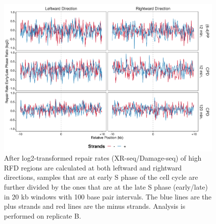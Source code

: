 \begin{figure}[H]
\begin{center}
\includegraphics[width=\textwidth]{Chapters/7_appendix/figures/supfig69}
\caption[Repair rate early/late ratio of high RFDs in 20 kb (replicate B).]{After log2-transformed repair rates (XR-seq/Damage-seq) of high RFD regions are calculated at both leftward and rightward directions, samples that are at early S phase of the cell cycle are further divided by the ones that are at the late S phase (early/late) in 20 kb windows with 100 base pair intervals. The blue lines are the plus strands and red lines are the minus strands. Analysis is performed on replicate B.}
\label{supfig:rrel20rfdB}
\end{center}
\end{figure}

